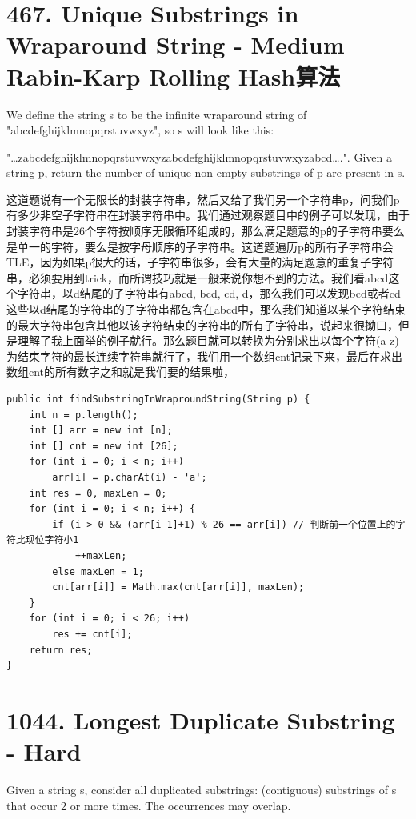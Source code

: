 \documentclass[9pt, b5paaper]{book}
\begin{document}
\section{467. Unique Substrings in Wraparound String - Medium Rabin-Karp Rolling Hash算法}
\label{sec-6-5}
We define the string s to be the infinite wraparound string of "abcdefghijklmnopqrstuvwxyz", so s will look like this:

"\ldots{}zabcdefghijklmnopqrstuvwxyzabcdefghijklmnopqrstuvwxyzabcd\ldots{}.".
Given a string p, return the number of unique non-empty substrings of p are present in s.

这道题说有一个无限长的封装字符串，然后又给了我们另一个字符串p，问我们p有多少非空子字符串在封装字符串中。我们通过观察题目中的例子可以发现，由于封装字符串是26个字符按顺序无限循环组成的，那么满足题意的p的子字符串要么是单一的字符，要么是按字母顺序的子字符串。这道题遍历p的所有子字符串会TLE，因为如果p很大的话，子字符串很多，会有大量的满足题意的重复子字符串，必须要用到trick，而所谓技巧就是一般来说你想不到的方法。我们看abcd这个字符串，以d结尾的子字符串有abcd, bcd, cd, d，那么我们可以发现bcd或者cd这些以d结尾的字符串的子字符串都包含在abcd中，那么我们知道以某个字符结束的最大字符串包含其他以该字符结束的字符串的所有子字符串，说起来很拗口，但是理解了我上面举的例子就行。那么题目就可以转换为分别求出以每个字符(a-z)为结束字符的最长连续字符串就行了，我们用一个数组cnt记录下来，最后在求出数组cnt的所有数字之和就是我们要的结果啦，

\begin{verbatim}
public int findSubstringInWraproundString(String p) {
    int n = p.length();
    int [] arr = new int [n];
    int [] cnt = new int [26];
    for (int i = 0; i < n; i++) 
        arr[i] = p.charAt(i) - 'a';
    int res = 0, maxLen = 0;
    for (int i = 0; i < n; i++) {
        if (i > 0 && (arr[i-1]+1) % 26 == arr[i]) // 判断前一个位置上的字符比现位字符小1
            ++maxLen;
        else maxLen = 1;
        cnt[arr[i]] = Math.max(cnt[arr[i]], maxLen);
    }
    for (int i = 0; i < 26; i++) 
        res += cnt[i];
    return res;
}
\end{verbatim}

\section{1044. Longest Duplicate Substring - Hard}
\label{sec-6-6}
Given a string s, consider all duplicated substrings: (contiguous) substrings of s that occur 2 or more times. The occurrences may overlap.
\end{document}
